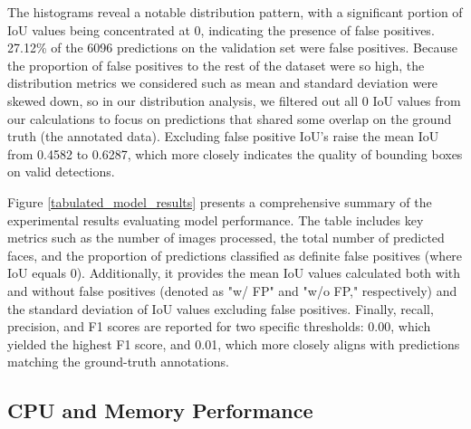 \documentclass[conference]{IEEEtran}
\begin{document}
The histograms reveal a notable distribution pattern, with a significant portion of IoU values being concentrated at 0, indicating the presence of false positives. 27.12\% of the 6096 predictions on the validation set were false positives. Because the proportion of false positives to the rest of the dataset were so high, the distribution metrics we considered such as mean and standard deviation were skewed down, so in our distribution analysis, we filtered out all 0 IoU values from our calculations to focus on predictions that shared some overlap on the ground truth (the annotated data). Excluding false positive IoU's raise the mean IoU from 0.4582 to 0.6287, which more closely indicates the quality of bounding boxes on valid detections. 

Figure \ref{tabulated_model_results} presents a comprehensive summary of the experimental results evaluating model performance. The table includes key metrics such as the number of images processed, the total number of predicted faces, and the proportion of predictions classified as definite false positives (where IoU equals 0). Additionally, it provides the mean IoU values calculated both with and without false positives (denoted as "w/ FP" and "w/o FP," respectively) and the standard deviation of IoU values excluding false positives. Finally, recall, precision, and F1 scores are reported for two specific thresholds: 0.00, which yielded the highest F1 score, and 0.01, which more closely aligns with predictions matching the ground-truth annotations.

\subsection{CPU and Memory Performance}
\end{document}
